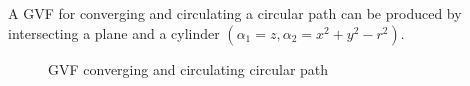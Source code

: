 \documentclass[conf]{new-aiaa}
\begin{document}
A GVF for converging and circulating a circular path can be produced by intersecting a plane and a cylinder $(\alpha_1 = z,\alpha_2 = x^2+y^2-r^2)$.
\begin{figure}[H]
	\begin{subfigmatrix}{2}%
		\centering	
		\hspace*{0mm}
	\end{subfigmatrix}
	\caption{GVF converging and circulating circular path}
	\label{fig:GVFLine}
\end{figure}

\end{document}
